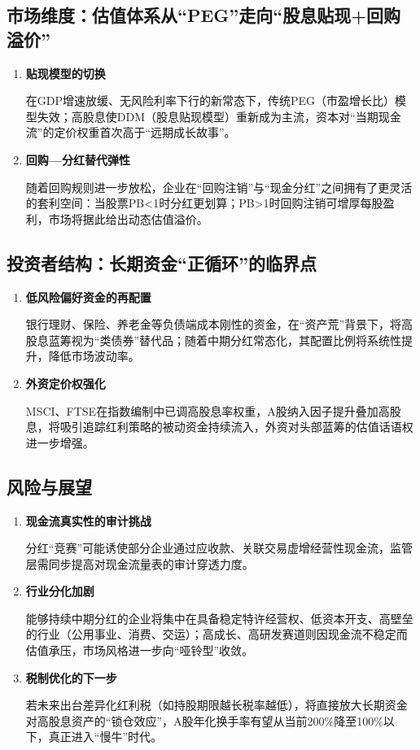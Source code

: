 \subsection{市场维度：估值体系从“PEG”走向“股息贴现+回购溢价”}
\begin{enumerate}[leftmargin=*, nosep]
    \item \textbf{贴现模型的切换}  
    
    在GDP增速放缓、无风险利率下行的新常态下，传统PEG（市盈增长比）模型失效；高股息使DDM（股息贴现模型）重新成为主流，资本对“当期现金流”的定价权重首次高于“远期成长故事”。
    \item \textbf{回购—分红替代弹性}  
    
    随着回购规则进一步放松，企业在“回购注销”与“现金分红”之间拥有了更灵活的套利空间：当股票PB<1时分红更划算；PB>1时回购注销可增厚每股盈利，市场将据此给出动态估值溢价。
\end{enumerate}

\subsection{投资者结构：长期资金“正循环”的临界点}
\begin{enumerate}[leftmargin=*, nosep]
    \item \textbf{低风险偏好资金的再配置}  
    
    银行理财、保险、养老金等负债端成本刚性的资金，在“资产荒”背景下，将高股息蓝筹视为“类债券”替代品；随着中期分红常态化，其配置比例将系统性提升，降低市场波动率。
    \item \textbf{外资定价权强化}  
    
    MSCI、FTSE在指数编制中已调高股息率权重，A股纳入因子提升叠加高股息，将吸引追踪红利策略的被动资金持续流入，外资对头部蓝筹的估值话语权进一步增强。
\end{enumerate}

\subsection{风险与展望}
\begin{enumerate}[leftmargin=*, nosep]
    \item \textbf{现金流真实性的审计挑战}  
    
    分红“竞赛”可能诱使部分企业通过应收款、关联交易虚增经营性现金流，监管层需同步提高对现金流量表的审计穿透力度。
    \item \textbf{行业分化加剧}  
    
    能够持续中期分红的企业将集中在具备稳定特许经营权、低资本开支、高壁垒的行业（公用事业、消费、交运）；高成长、高研发赛道则因现金流不稳定而估值承压，市场风格进一步向“哑铃型”收敛。
    \item \textbf{税制优化的下一步}  
    
    若未来出台差异化红利税（如持股期限越长税率越低），将直接放大长期资金对高股息资产的“锁仓效应”，A股年化换手率有望从当前200\%降至100\%以下，真正进入“慢牛”时代。
\end{enumerate}


